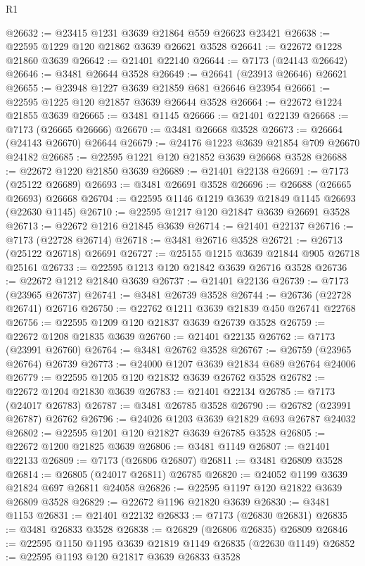 \begin{lexlean}{R1}
\begin{coremodule}
@26632 := @23415 @1231 @3639 @21864 @559 @26623 @23421
@26638 := @22595 @1229 @120 @21862 @3639 @26621 @3528
@26641 := @22672 @1228 @21860 @3639
@26642 := @21401 @22140
@26644 := @7173 (@24143 @26642)
@26646 := @3481 @26644 @3528
@26649 := @26641 (@23913 @26646) @26621
@26655 := @23948 @1227 @3639 @21859 @681 @26646 @23954
@26661 := @22595 @1225 @120 @21857 @3639 @26644 @3528
@26664 := @22672 @1224 @21855 @3639
@26665 := @3481 @1145
@26666 := @21401 @22139
@26668 := @7173 (@26665 @26666)
@26670 := @3481 @26668 @3528
@26673 := @26664 (@24143 @26670) @26644
@26679 := @24176 @1223 @3639 @21854 @709 @26670 @24182
@26685 := @22595 @1221 @120 @21852 @3639 @26668 @3528
@26688 := @22672 @1220 @21850 @3639
@26689 := @21401 @22138
@26691 := @7173 (@25122 @26689)
@26693 := @3481 @26691 @3528
@26696 := @26688 (@26665 @26693) @26668
@26704 := @22595 @1146 @1219 @3639 @21849 @1145 @26693 (@22630 @1145)
@26710 := @22595 @1217 @120 @21847 @3639 @26691 @3528
@26713 := @22672 @1216 @21845 @3639
@26714 := @21401 @22137
@26716 := @7173 (@22728 @26714)
@26718 := @3481 @26716 @3528
@26721 := @26713 (@25122 @26718) @26691
@26727 := @25155 @1215 @3639 @21844 @905 @26718 @25161
@26733 := @22595 @1213 @120 @21842 @3639 @26716 @3528
@26736 := @22672 @1212 @21840 @3639
@26737 := @21401 @22136
@26739 := @7173 (@23965 @26737)
@26741 := @3481 @26739 @3528
@26744 := @26736 (@22728 @26741) @26716
@26750 := @22762 @1211 @3639 @21839 @450 @26741 @22768
@26756 := @22595 @1209 @120 @21837 @3639 @26739 @3528
@26759 := @22672 @1208 @21835 @3639
@26760 := @21401 @22135
@26762 := @7173 (@23991 @26760)
@26764 := @3481 @26762 @3528
@26767 := @26759 (@23965 @26764) @26739
@26773 := @24000 @1207 @3639 @21834 @689 @26764 @24006
@26779 := @22595 @1205 @120 @21832 @3639 @26762 @3528
@26782 := @22672 @1204 @21830 @3639
@26783 := @21401 @22134
@26785 := @7173 (@24017 @26783)
@26787 := @3481 @26785 @3528
@26790 := @26782 (@23991 @26787) @26762
@26796 := @24026 @1203 @3639 @21829 @693 @26787 @24032
@26802 := @22595 @1201 @120 @21827 @3639 @26785 @3528
@26805 := @22672 @1200 @21825 @3639
@26806 := @3481 @1149
@26807 := @21401 @22133
@26809 := @7173 (@26806 @26807)
@26811 := @3481 @26809 @3528
@26814 := @26805 (@24017 @26811) @26785
@26820 := @24052 @1199 @3639 @21824 @697 @26811 @24058
@26826 := @22595 @1197 @120 @21822 @3639 @26809 @3528
@26829 := @22672 @1196 @21820 @3639
@26830 := @3481 @1153
@26831 := @21401 @22132
@26833 := @7173 (@26830 @26831)
@26835 := @3481 @26833 @3528
@26838 := @26829 (@26806 @26835) @26809
@26846 := @22595 @1150 @1195 @3639 @21819 @1149 @26835 (@22630 @1149)
@26852 := @22595 @1193 @120 @21817 @3639 @26833 @3528

\end{coremodule}
\end{lexlean}
